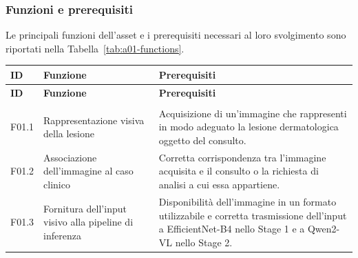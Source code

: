 \subsubsection{Funzioni e prerequisiti}
Le principali funzioni dell'asset e i prerequisiti necessari al loro svolgimento sono riportati nella Tabella~\ref{tab:a01-functions}.

{
\small
{}
\setlength{\tabcolsep}{4pt}
\renewcommand{\arraystretch}{1.08}

\begin{xltabular}{\textwidth}{
    >{\raggedright\arraybackslash}p{1.1cm}
    >{\raggedright\arraybackslash}p{3.8cm}
    X
}

\toprule

\textbf{ID} &
\textbf{Funzione} &
\textbf{Prerequisiti} \\

\midrule

\endfirsthead

\toprule

\textbf{ID} &
\textbf{Funzione} &
\textbf{Prerequisiti} \\

\midrule

\endhead

 \\
\endfoot

\endlastfoot


F01.1 &

Rappresentazione visiva della lesione &

Acquisizione di un'immagine che rappresenti in modo adeguato
la lesione dermatologica oggetto del consulto. \\

\midrule


F01.2 &

Associazione dell'immagine al caso clinico &

Corretta corrispondenza tra l'immagine acquisita e il consulto
o la richiesta di analisi a cui essa appartiene. \\

\midrule


F01.3 &

Fornitura dell'input visivo alla pipeline di inferenza &

Disponibilità dell'immagine in un formato utilizzabile e corretta
trasmissione dell'input a EfficientNet-B4 nello Stage 1 e a Qwen2-VL
nello Stage 2. \\


\end{xltabular}}
